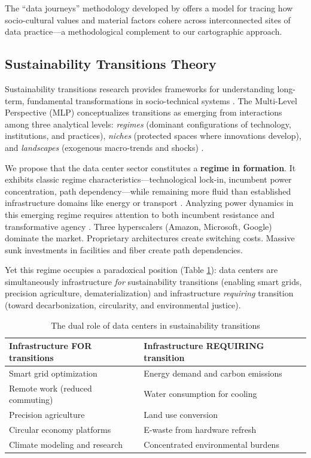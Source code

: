 \documentclass[review]{elsarticle}
\begin{document}
The ``data journeys'' methodology developed by \citet{Bates2016} offers a model for tracing how socio-cultural values and material factors cohere across interconnected sites of data practice---a methodological complement to our cartographic approach.

\subsection{Sustainability Transitions Theory}

Sustainability transitions research provides frameworks for understanding long-term, fundamental transformations in socio-technical systems \citep{Markard2012}. The Multi-Level Perspective (MLP) conceptualizes transitions as emerging from interactions among three analytical levels: \textit{regimes} (dominant configurations of technology, institutions, and practices), \textit{niches} (protected spaces where innovations develop), and \textit{landscapes} (exogenous macro-trends and shocks) \citep{Geels2002}.

We propose that the data center sector constitutes a \textbf{regime in formation}. It exhibits classic regime characteristics---technological lock-in, incumbent power concentration, path dependency---while remaining more fluid than established infrastructure domains like energy or transport \citep{Sovacool2021, Turnheim2012}. Analyzing power dynamics in this emerging regime requires attention to both incumbent resistance and transformative agency \citep{Avelino2009, Avelino2016}. Three hyperscalers (Amazon, Microsoft, Google) dominate the market. Proprietary architectures create switching costs. Massive sunk investments in facilities and fiber create path dependencies.

Yet this regime occupies a paradoxical position (Table \ref{tab:paradox}): data centers are simultaneously infrastructure \textit{for} sustainability transitions (enabling smart grids, precision agriculture, dematerialization) and infrastructure \textit{requiring} transition (toward decarbonization, circularity, and environmental justice).

\begin{table}[h]
\caption{The dual role of data centers in sustainability transitions}
\label{tab:paradox}
\begin{tabular}{p{5.5cm}p{5.5cm}}
\toprule
\textbf{Infrastructure FOR transitions} & \textbf{Infrastructure REQUIRING transition} \\
\midrule
Smart grid optimization & Energy demand and carbon emissions \\
Remote work (reduced commuting) & Water consumption for cooling \\
Precision agriculture & Land use conversion \\
Circular economy platforms & E-waste from hardware refresh \\
Climate modeling and research & Concentrated environmental burdens \\
\bottomrule
\end{tabular}
\end{table}
\end{document}
